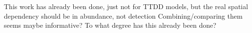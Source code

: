 \documentclass[useAMS,usenatbib,referee,12pt]{article}
\begin{document}
%
%


This work has already been done, just not for TTDD models, but the real spatial dependency should be in abundance, not detection
Combining/comparing them seems maybe informative?  To what degree has this already been done?



\end{document}
